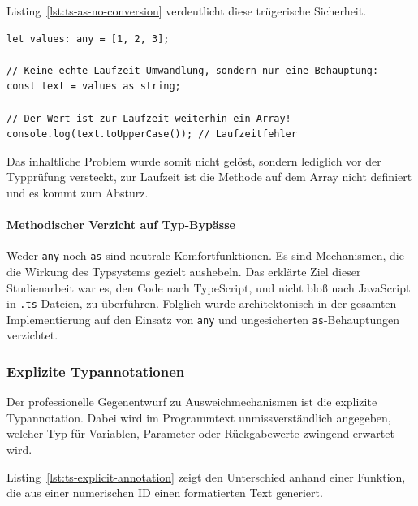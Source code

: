 Listing~\ref{lst:ts-as-no-conversion} verdeutlicht diese trügerische Sicherheit.

\begin{listing}[htbp]
    \caption{Eine  ist keine echte Umwandlung}
    \label{lst:ts-as-no-conversion}
    \begin{verbatim}
let values: any = [1, 2, 3];

// Keine echte Laufzeit-Umwandlung, sondern nur eine Behauptung:
const text = values as string;

// Der Wert ist zur Laufzeit weiterhin ein Array!
console.log(text.toUpperCase()); // Laufzeitfehler
    \end{verbatim}
\end{listing}

Das inhaltliche Problem wurde somit nicht gelöst, sondern lediglich vor der Typprüfung versteckt, zur Laufzeit ist die Methode auf dem Array nicht definiert und es kommt zum Absturz.


\paragraph{Methodischer Verzicht auf Typ-Bypässe}
\label{par:verzicht-any-as}

Weder \texttt{any} noch \texttt{as} sind neutrale Komfortfunktionen. Es sind Mechanismen, die die Wirkung des Typsystems gezielt aushebeln. Das erklärte Ziel dieser Studienarbeit war es, den Code nach TypeScript, und nicht bloß nach JavaScript in \texttt{.ts}-Dateien, zu überführen. Folglich wurde architektonisch in der gesamten Implementierung auf den Einsatz von \texttt{any} und ungesicherten \texttt{as}-Behauptungen verzichtet.


\subsubsection{Explizite Typannotationen}
\label{subsubsec:explizite-typannotation}

Der professionelle Gegenentwurf zu Ausweichmechanismen ist die explizite Typannotation. Dabei wird im Programmtext unmissverständlich angegeben, welcher Typ für Variablen, Parameter oder Rückgabewerte zwingend erwartet wird.

Listing~\ref{lst:ts-explicit-annotation} zeigt den Unterschied anhand einer Funktion, die aus einer numerischen ID einen formatierten Text generiert.

